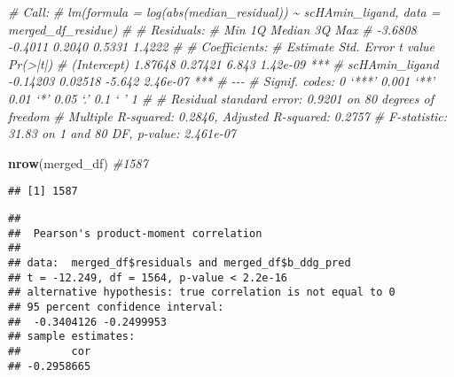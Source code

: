 \documentclass[
]{article}
\newenvironment{Shaded}{\begin{snugshade}}{\end{snugshade}}
\newcommand{\CommentTok}[1]{\textcolor[rgb]{0.56,0.35,0.01}{\textit{#1}}}
\newcommand{\FunctionTok}[1]{\textcolor[rgb]{0.13,0.29,0.53}{\textbf{#1}}}
\newcommand{\NormalTok}[1]{#1}
\newcommand{\SpecialCharTok}[1]{\textcolor[rgb]{0.81,0.36,0.00}{\textbf{#1}}}
\begin{document}
\begin{Shaded}
\begin{Highlighting}[]
\CommentTok{\# Call:}
\CommentTok{\# lm(formula = log(abs(median\_residual)) \textasciitilde{} scHAmin\_ligand, data = merged\_df\_residue)}
\CommentTok{\# }
\CommentTok{\# Residuals:}
\CommentTok{\#     Min      1Q  Median      3Q     Max }
\CommentTok{\# {-}3.6808 {-}0.4011  0.2040  0.5331  1.4222 }
\CommentTok{\# }
\CommentTok{\# Coefficients:}
\CommentTok{\#                Estimate Std. Error t value Pr(\textgreater{}|t|)    }
\CommentTok{\# (Intercept)     1.87648    0.27421   6.843 1.42e{-}09 ***}
\CommentTok{\# scHAmin\_ligand {-}0.14203    0.02518  {-}5.642 2.46e{-}07 ***}
\CommentTok{\# {-}{-}{-}}
\CommentTok{\# Signif. codes:  0 ‘***’ 0.001 ‘**’ 0.01 ‘*’ 0.05 ‘.’ 0.1 ‘ ’ 1}
\CommentTok{\# }
\CommentTok{\# Residual standard error: 0.9201 on 80 degrees of freedom}
\CommentTok{\# Multiple R{-}squared:  0.2846,  Adjusted R{-}squared:  0.2757 }
\CommentTok{\# F{-}statistic: 31.83 on 1 and 80 DF,  p{-}value: 2.461e{-}07}
\end{Highlighting}
\end{Shaded}

\begin{Shaded}
\begin{Highlighting}[]
\FunctionTok{nrow}\NormalTok{(merged\_df) }\CommentTok{\#1587}
\end{Highlighting}
\end{Shaded}

\begin{verbatim}
## [1] 1587
\end{verbatim}

\begin{Shaded}
\end{Shaded}

\begin{verbatim}
## 
##  Pearson's product-moment correlation
## 
## data:  merged_df$residuals and merged_df$b_ddg_pred
## t = -12.249, df = 1564, p-value < 2.2e-16
## alternative hypothesis: true correlation is not equal to 0
## 95 percent confidence interval:
##  -0.3404126 -0.2499953
## sample estimates:
##        cor 
## -0.2958665
\end{verbatim}
\end{document}
